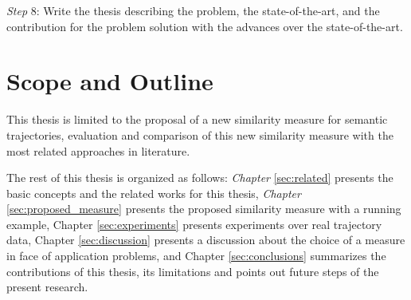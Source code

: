 \textit{Step} 8: Write the thesis describing the problem, the state-of-the-art, and the contribution for the problem solution with the advances over the state-of-the-art.

\section{Scope and Outline}

This thesis is limited to the proposal of a new similarity measure for semantic trajectories, evaluation and comparison of this new similarity measure with the most related approaches in literature. 

The rest of this thesis is organized as follows: \textit{Chapter} \ref{sec:related} presents the basic concepts and the related works for this thesis, \textit{Chapter} \ref{sec:proposed_measure} presents the proposed similarity measure with a running example, Chapter \ref{sec:experiments} presents experiments over real trajectory data, Chapter \ref{sec:discussion} presents a discussion about the choice of a measure in face of application problems, and Chapter \ref{sec:conclusions} summarizes the contributions of this thesis, its limitations and points out future steps of the present research.
